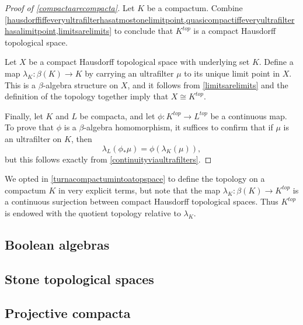 \begin{proof}[Proof of \ref{compactaarecompacta}]
	Let $ K $ be a compactum.
	Combine \ref{hausdorffiffeveryultrafilterhasatmostonelimitpoint,quasicompactiffeveryultrafilterhasalimitpoint,limitsarelimits} to conclude that $ K^{\textit{top}} $ is a compact Hausdorff topological space.

	Let $ X $ be a compact Hausdorff topological space with underlying set $ K $.
	Define a map $ \lambda_K \colon \beta(K) \to K $ by carrying an ultrafilter $ \mu $ to its unique limit point in $ X $.
	This is a $ \beta $-algebra structure on $ X $, and it follows from \ref{limitsarelimits} and the definition of the topology together imply that $ X \cong K^{\textit{top}}$.

	Finally, let $ K $ and $ L $ be compacta, and let $ \phi \colon K^{\textit{top}} \to L^{\textit{top}} $ be a continuous map.
	To prove that $ \phi $ is a $ \beta $-algebra homomorphism, it suffices to confirm that if $ \mu $ is an ultrafilter on $ K $, then
	\[
		\lambda_L (\phi_{\ast} \mu) = \phi (\lambda_K(\mu)) \comma
	\]
	but this follows exactly from \ref{continuityviaultrafilters}.
\end{proof}

\begin{nul}
	We opted in \ref{turnacompactumintoatopspace} to define the topology on a compactum $ K $ in very explicit terms, but note that the map $ \lambda_K \colon \beta(K) \to K^{\textit{top}} $ is a continuous surjection between compact Hausdorff topological spaces.
	Thus $ K^{\textit{top}} $ is endowed with the quotient topology relative to $ \lambda_K $.
\end{nul}

\subsection{Boolean algebras}%
\label{sub:boolean_algebras}


\subsection{Stone topological spaces}%
\label{sub:stone_topological_spaces}

\subsection{Projective compacta}%
\label{sub:projective_compacta}

